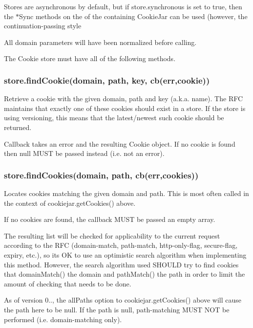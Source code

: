 Stores are asynchronous by default, but if {\ttfamily store.\+synchronous} is set to {\ttfamily true}, then the {\ttfamily $\ast$\+Sync} methods on the of the containing {\ttfamily Cookie\+Jar} can be used (however, the continuation-\/passing style

All {\ttfamily domain} parameters will have been normalized before calling.

The Cookie store must have all of the following methods.

\subsubsection*{{\ttfamily store.\+find\+Cookie(domain, path, key, cb(err,cookie))}}

Retrieve a cookie with the given domain, path and key (a.\+k.\+a. name). The R\+F\+C maintains that exactly one of these cookies should exist in a store. If the store is using versioning, this means that the latest/newest such cookie should be returned.

Callback takes an error and the resulting {\ttfamily Cookie} object. If no cookie is found then {\ttfamily null} M\+U\+S\+T be passed instead (i.\+e. not an error).

\subsubsection*{{\ttfamily store.\+find\+Cookies(domain, path, cb(err,cookies))}}

Locates cookies matching the given domain and path. This is most often called in the context of {\ttfamily cookiejar.\+get\+Cookies()} above.

If no cookies are found, the callback M\+U\+S\+T be passed an empty array.

The resulting list will be checked for applicability to the current request according to the R\+F\+C (domain-\/match, path-\/match, http-\/only-\/flag, secure-\/flag, expiry, etc.), so it\textquotesingle{}s O\+K to use an optimistic search algorithm when implementing this method. However, the search algorithm used S\+H\+O\+U\+L\+D try to find cookies that {\ttfamily domain\+Match()} the domain and {\ttfamily path\+Match()} the path in order to limit the amount of checking that needs to be done.

As of version 0.., the {\ttfamily all\+Paths} option to {\ttfamily cookiejar.\+get\+Cookies()} above will cause the path here to be {\ttfamily null}. If the path is {\ttfamily null}, path-\/matching M\+U\+S\+T N\+O\+T be performed (i.\+e. domain-\/matching only).

